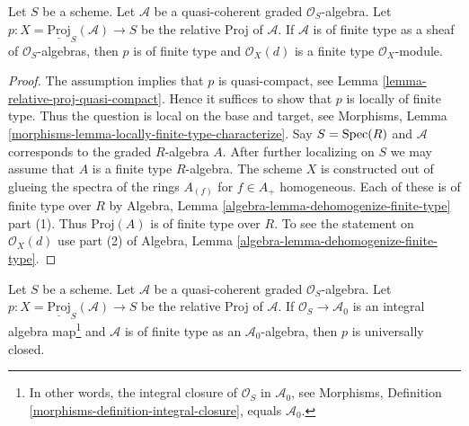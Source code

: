 \begin{lemma}
\label{lemma-relative-proj-finite-type}
Let $S$ be a scheme. Let $\mathcal{A}$ be a quasi-coherent graded
$\mathcal{O}_S$-algebra. Let
$p : X = \underline{\text{Proj}}_S(\mathcal{A}) \to S$ be the relative
Proj of $\mathcal{A}$. If $\mathcal{A}$ is of finite type as a sheaf of
$\mathcal{O}_S$-algebras, then $p$ is of finite type and $\mathcal{O}_X(d)$
is a finite type $\mathcal{O}_X$-module.
\end{lemma}

\begin{proof}
The assumption implies that $p$ is quasi-compact, see
Lemma \ref{lemma-relative-proj-quasi-compact}. Hence it suffices
to show that $p$ is locally of finite type.
Thus the question is local on the base and target, see
Morphisms, Lemma \ref{morphisms-lemma-locally-finite-type-characterize}.
Say $S = \mathop{\mathrm{Spec}}(R)$ and $\mathcal{A}$ corresponds to the
graded $R$-algebra $A$. After further localizing on $S$ we may
assume that $A$ is a finite type $R$-algebra. The scheme $X$ is constructed
out of glueing the spectra of the rings $A_{(f)}$ for $f \in A_{+}$
homogeneous. Each of these is of finite type over $R$ by
Algebra, Lemma \ref{algebra-lemma-dehomogenize-finite-type} part (1).
Thus $\text{Proj}(A)$ is of finite type over $R$.
To see the statement on $\mathcal{O}_X(d)$ use part (2) of
Algebra, Lemma \ref{algebra-lemma-dehomogenize-finite-type}.
\end{proof}

\begin{lemma}
\label{lemma-relative-proj-universally-closed}
Let $S$ be a scheme. Let $\mathcal{A}$ be a quasi-coherent graded
$\mathcal{O}_S$-algebra. Let
$p : X = \underline{\text{Proj}}_S(\mathcal{A}) \to S$ be the relative
Proj of $\mathcal{A}$. If $\mathcal{O}_S \to \mathcal{A}_0$
is an integral algebra map\footnote{In other words, the integral
closure of $\mathcal{O}_S$ in $\mathcal{A}_0$, see
Morphisms, Definition \ref{morphisms-definition-integral-closure}, equals
$\mathcal{A}_0$.} and $\mathcal{A}$ is of finite type as an
$\mathcal{A}_0$-algebra, then $p$ is universally closed.
\end{lemma}

